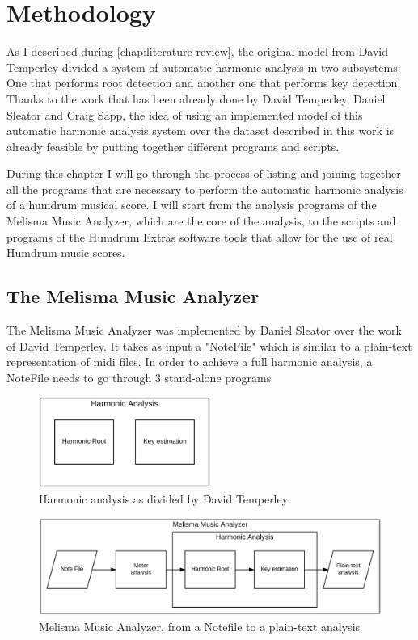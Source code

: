 \normallinespacing

\chapter{Methodology}
\label{chap:methodology}

As I described during \autoref{chap:literature-review}, the original model from David Temperley divided a system of automatic harmonic analysis in two subsystems: One that performs root detection and another one that performs key detection. Thanks to the work that has been already done by David Temperley, Daniel Sleator and Craig Sapp, the idea of using an implemented model of this automatic harmonic analysis system over the dataset described in this work is already feasible by putting together different programs and scripts.

During this chapter I will go through the process of listing and joining together all the programs that are necessary to perform the automatic harmonic analysis of a humdrum musical score. I will start from the analysis programs of the Melisma Music Analyzer, which are the core of the analysis, to the scripts and programs of the Humdrum Extras software tools that allow for the use of real Humdrum music scores.

\section{The Melisma Music Analyzer}
  The Melisma Music Analyzer was implemented by Daniel Sleator over the work of David Temperley. It takes as input a "NoteFile" which is similar to a plain-text representation of midi files.
  In order to achieve a full harmonic analysis, a NoteFile needs to go through 3 stand-alone programs

  \begin{figure}[ht]
    \centering
      \includegraphics[width=0.5\textwidth]{04-methodology/figures/1}
    \caption{Harmonic analysis as divided by David Temperley}
    \label{fig:software_stack1}
  \end{figure}

  \begin{figure}[ht]
    \centering
      \includegraphics[width=1.0\textwidth]{04-methodology/figures/2}
    \caption{Melisma Music Analyzer, from a Notefile to a plain-text analysis}
    \label{fig:software_stack2}
  \end{figure}

